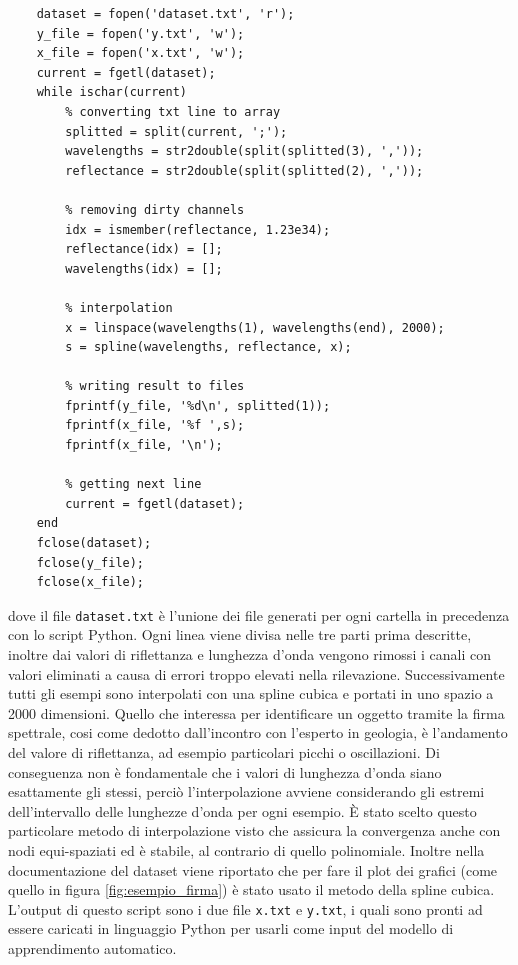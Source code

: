 \begin{lstlisting}
    dataset = fopen('dataset.txt', 'r');
    y_file = fopen('y.txt', 'w');
    x_file = fopen('x.txt', 'w');
    current = fgetl(dataset);
    while ischar(current)
        % converting txt line to array
        splitted = split(current, ';');
        wavelengths = str2double(split(splitted(3), ','));
        reflectance = str2double(split(splitted(2), ','));
        
        % removing dirty channels
        idx = ismember(reflectance, 1.23e34);
        reflectance(idx) = [];
        wavelengths(idx) = [];
        
        % interpolation
        x = linspace(wavelengths(1), wavelengths(end), 2000);
        s = spline(wavelengths, reflectance, x);
        
        % writing result to files
        fprintf(y_file, '%d\n', splitted(1));
        fprintf(x_file, '%f ',s);
        fprintf(x_file, '\n');
        
        % getting next line
        current = fgetl(dataset);
    end
    fclose(dataset);
    fclose(y_file);
    fclose(x_file);
\end{lstlisting}
dove il file \verb|dataset.txt| è l'unione dei file generati per ogni cartella in precedenza con lo script Python.
Ogni linea viene divisa nelle tre parti prima descritte, inoltre dai valori di riflettanza e lunghezza d'onda vengono rimossi i canali con valori eliminati a causa di errori troppo elevati nella rilevazione.
Successivamente tutti gli esempi sono interpolati con una spline cubica e portati in uno spazio a 2000 dimensioni. Quello che interessa per identificare un oggetto tramite la firma spettrale, cosi come dedotto dall'incontro con l'esperto in geologia, è l'andamento del valore di riflettanza, ad esempio particolari picchi o oscillazioni. Di conseguenza non è fondamentale che i valori di lunghezza d'onda siano esattamente gli stessi, perciò l'interpolazione avviene considerando gli estremi dell'intervallo delle lunghezze d'onda per ogni esempio. È stato scelto questo particolare metodo di interpolazione visto che assicura la convergenza anche con nodi equi-spaziati ed è stabile, al contrario di quello polinomiale.
Inoltre nella documentazione del dataset viene riportato che per fare il plot dei grafici (come quello in figura \ref{fig:esempio_firma}) è stato usato il metodo della spline cubica.\\
L'output di questo script sono i due file \verb|x.txt| e \verb|y.txt|, i quali sono pronti ad essere caricati in linguaggio Python per usarli come input del modello di apprendimento automatico.

